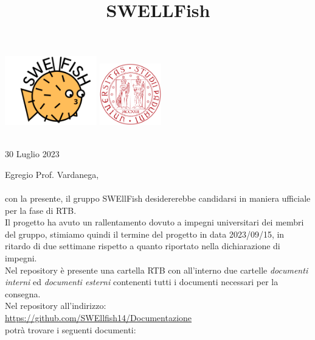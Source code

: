 \documentclass[12pt]{article}
\begin{document}
\graphicspath{ {../templates/img/} }
\title{SWELLFish}

\begin{center}
    \includegraphics[width=0.3\textwidth]{../templates/img/Swellfish_logo.png}
    \hspace{3cm}
    \includegraphics[width=0.2\textwidth]{../templates/img/logoUnipd.png}\\
    \end{center}
    \begin{flushright}
        \
        \textbf{}\\
        30 Luglio 2023
    \end{flushright}  

Egregio Prof. Vardanega,\\\\
con la presente, il gruppo SWEllFish desidererebbe candidarsi in maniera ufficiale
per la fase di RTB.\\

Il progetto ha avuto un rallentamento dovuto a impegni universitari dei membri del gruppo, stimiamo quindi il termine del progetto in data 2023/09/15, in ritardo di due settimane rispetto a quanto riportato nella dichiarazione di impegni.\\

Nel repository è presente una cartella RTB con all’interno due cartelle \textit{documenti interni} ed \textit{documenti esterni} contenenti tutti i documenti necessari
per la consegna.\\

Nel repository all'indirizzo: \\
\href{https://github.com/SWEllfish14/Documentazione}{\underline{https://github.com/SWEllfish14/Documentazione}}\\ 
potrà trovare i seguenti documenti:\\\\
\end{document}
